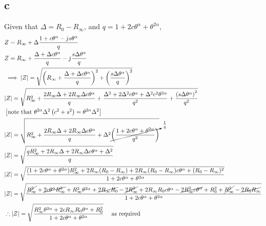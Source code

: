 \subsection{c}
Given that $\Delta = R_0 - R_\infty$, and $q = 1+2c\theta^\alpha + \theta^{2\alpha}$,
\begin{equation}
\begin{split}
	&Z = R_\infty + \Delta \frac{
		1 + c\theta^\alpha - js\theta^\alpha
	}{
		q
	} \\
	&Z = R_\infty + \frac{
		\Delta + \Delta c\theta^\alpha
	}{
		q
	}
	-j \frac{
		s\Delta\theta^\alpha
	}{
		q
	} \\
	&\implies |Z| =  \sqrt{
		{
			\left(
				R_\infty + \frac{\Delta + \Delta c\theta^\alpha}{q}
			\right)
		}^2
		+
		{
			\left(
				\frac{s\Delta\theta^\alpha}{q}
			\right)
		}^2
	} \\
	&|Z| = \sqrt{
	R_\infty^2 +
	\frac{
		2R_\infty\Delta + 2R_\infty \Delta c\theta^\alpha
	}{
		q
	} +
	\frac{\Delta^2 + 2\Delta^2c\theta^\alpha + \Delta^2c^2\theta^{2\alpha}}{q^2}
	+
		\frac{ {(s\Delta\theta^\alpha)}^2 }{q^2}
	} \\
	&  \left[\text{note that }
		\theta^{2\alpha}\Delta^2 \left(
			c^2 +s^2
		 \right)
	= \theta^{2\alpha}\Delta^2
	\right] \\
	&|Z|= \sqrt{
		R_\infty^2 +
		\frac{
			2R_\infty\Delta + 2R_\infty \Delta c\theta^\alpha
		}{
				q
		} +
		\Delta^2
		\cancelto{
			\frac{1}{q}
		}{
			\left(
				\frac{ 1 + 2c\theta^\alpha + \theta^{2\alpha} }{q^2}
			\right)
		}
	} \\
	& |Z|= \sqrt{
			\frac{
				qR_\infty^2+ 2R_\infty\Delta + 2R_\infty \Delta c\theta^\alpha
		+ \Delta^2
		}{
			q
		}
	} \\
	& |Z|= \sqrt{
		\frac{
			(1+2c\theta^\alpha + \theta^{2\alpha})R_\infty^2+ 2R_\infty (R_0 - R_\infty) + 2R_\infty (R_0 - R_\infty) c\theta^\alpha
	+ (R_0 - R_\infty)^2
	}{
		1+2c\theta^\alpha + \theta^{2\alpha}
	}
} \\
	&|Z|= \sqrt{
		\frac{
		\cancel{R_\infty^2} + \cancel{2c\theta^\alpha R_\infty^2} + R_\infty^2\theta^{2\alpha} + 
		\cancel{2R_\infty R_0} - \cancel{2R_\infty^2}+
		2R_\infty R_0c\theta^\alpha - \cancel{2R_\infty^2c\theta^\alpha}
		+ R_0^2 + \cancel{R_\infty^2} - \cancel{2R_0R_\infty}
		}
		{1+2c\theta^\alpha + \theta^{2\alpha}
		}
	} \\
	&\therefore  |Z| = \sqrt{
		\frac{
			R_\infty^2\theta^{2\alpha} +
			2cR_\infty R_0 \theta^\alpha +
			R_0^2
		}{
			1+2c\theta^\alpha + \theta^{2\alpha}
		}
	} \quad \text{ as required}
\end{split}
\end{equation}
